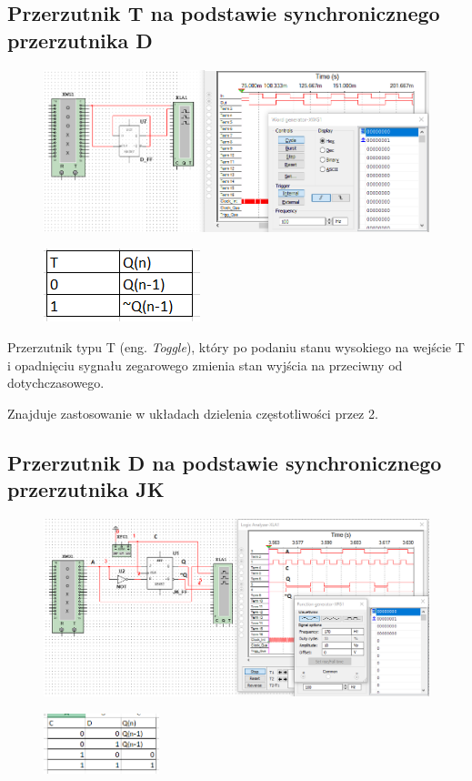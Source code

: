 \documentclass[12pt,a4paper]{article}
\begin{document}
\subsection{Przerzutnik T na podstawie synchronicznego przerzutnika D}
\begin{figure}[H]
\centering
\includegraphics[width=\textwidth]{img/3e}
\end{figure}
\begin{figure}[H]
\centering
\includegraphics{img/3eTruthTable}
\end{figure}

Przerzutnik typu T (eng. \textit{Toggle}), który po podaniu stanu wysokiego na wejście T i opadnięciu sygnału zegarowego zmienia stan wyjścia na przeciwny od dotychczasowego.

Znajduje zastosowanie w układach dzielenia częstotliwości przez 2.

\subsection{Przerzutnik D na podstawie synchronicznego przerzutnika JK}
\begin{figure}[H]
\centering
\includegraphics[width=\textwidth]{img/3f}
\end{figure}
\begin{figure}[H]
\centering
\includegraphics[width=0.3\textwidth]{img/3dTruthTable}
\end{figure}
\end{document}
